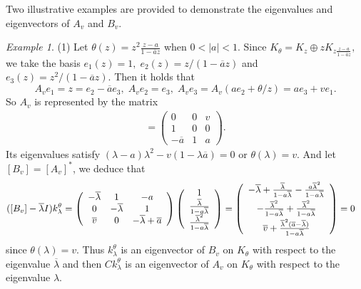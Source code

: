 \documentclass[12pt,reqno]{amsart}
\theoremstyle{definition}
\theoremstyle{remark}
\newtheorem{exm}[thm]{Example}
\numberwithin{equation}{section}
\newcommand{\ol}{\overline}
\begin{document}
Two illustrative examples are provided to demonstrate the eigenvalues and eigenvectors of  $A_v$ and $B_v$.
\begin{exm} (1)\;  Let $\theta(z)=z^2\frac{z-a}{1-\ol{a}z}$ when $0<|a|<1.$ Since $K_\theta=K_z\oplus zK_{z\frac{z-a}{1-\ol{a}z}},$ we take the basis  $e_1(z)=1,\;e_2(z)=z/(1-\ol{a}z)$ and $e_3(z)=z^2/(1-\ol{a}z).$
Then it holds that $$A_v e_1=z=e_2-\ol{a}e_3,\;A_ve_2=e_3,\; A_ve_3=A_v(ae_2+\theta/z)=ae_3
+ve_1.$$ So  $A_v$ is represented by the matrix
\begin{align*}[A_v]=\left(\begin{array}{ccc}0 & 0 & v\\
1 & 0& 0\\ -\ol{a} & 1 & a    \end{array}\right).\end{align*}
Its eigenvalues  satisfy $(\lambda-a)\lambda^2-v(1-\lambda\ol{a})=0$ or $\theta(\lambda)=v.$ And let  $[B_v]=[A_v]^*$, we deduce that \begin{align*} ([B_v]-\ol{\lambda}I)k_{\lambda}^\theta
&=\left(\begin{array}{ccc}-\ol{\lambda} & 1 &-{a}\\
0 & -\ol{\lambda}& 1\\ \ol{v} &0 &-\ol{\lambda}+\ol{a}   \end{array}\right) \left(\begin{array}{c}1\\ \frac{\ol{\lambda}}{1-a \ol{\lambda}}\\
\frac{\ol{\lambda}^2}{1-a \ol{\lambda}} \end{array}\right)
 =\left(\begin{array}{c}-\ol{\lambda}+\frac{\ol{\lambda}}{1-a \ol{\lambda}}-\frac{a\ol{\lambda}^2}{1-a \ol{\lambda}}\vspace{1mm}\\ -\frac{\ol{\lambda}^2}{1-a \ol{\lambda}}+\frac{\ol{\lambda}^2}{1-a \ol{\lambda}}\vspace{1mm}\\ \ol{v}+
\frac{\ol{\lambda}^2( \ol{a}-\ol{\lambda})}{1-a \ol{\lambda}} \end{array}\right)=0 \end{align*}
since $\theta(\lambda)=v.$ Thus $k_\lambda^\theta$ is   an eigenvector of $B_v$  on $K_\theta$ with respect to the eigenvalue $\ol{\lambda}$ and then $Ck_\lambda^\theta$ is   an eigenvector of $A_v$  on $K_\theta$ with respect to the eigenvalue $\lambda$.

\vspace{1mm}


\end{exm}
\end{document}
